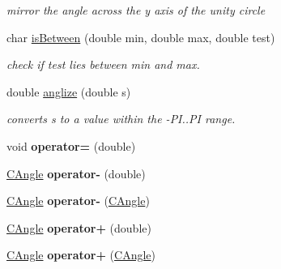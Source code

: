 \begin{DoxyCompactItemize}
\begin{DoxyCompactList}\small\item\em mirror the angle across the y axis of the unity circle \item\end{DoxyCompactList}\item 
char \hyperlink{class_c_angle_ab03cb0f761ee06e80835094b5817ba94}{isBetween} (double min, double max, double test)
\begin{DoxyCompactList}\small\item\em check if test lies between min and max. \item\end{DoxyCompactList}\item 
\hypertarget{class_c_angle_a72fd75c6aad269f339e0d7fc926e7569}{
double \hyperlink{class_c_angle_a72fd75c6aad269f339e0d7fc926e7569}{anglize} (double s)}
\label{class_c_angle_a72fd75c6aad269f339e0d7fc926e7569}

\begin{DoxyCompactList}\small\item\em converts s to a value within the -\/PI..PI range. \item\end{DoxyCompactList}\item 
\hypertarget{class_c_angle_a84945f984d1088fb0fa09b3c44b004ea}{
void {\bfseries operator=} (double)}
\label{class_c_angle_a84945f984d1088fb0fa09b3c44b004ea}

\item 
\hypertarget{class_c_angle_a9ccb59ecd849db986d78a44c69fa284a}{
\hyperlink{class_c_angle}{CAngle} {\bfseries operator-\/} (double)}
\label{class_c_angle_a9ccb59ecd849db986d78a44c69fa284a}

\item 
\hypertarget{class_c_angle_a6eb4a85cbb07d353873a34cfad48f337}{
\hyperlink{class_c_angle}{CAngle} {\bfseries operator-\/} (\hyperlink{class_c_angle}{CAngle})}
\label{class_c_angle_a6eb4a85cbb07d353873a34cfad48f337}

\item 
\hypertarget{class_c_angle_a0069cc4eb3577b04495b63bf1d1e2a15}{
\hyperlink{class_c_angle}{CAngle} {\bfseries operator+} (double)}
\label{class_c_angle_a0069cc4eb3577b04495b63bf1d1e2a15}

\item 
\hypertarget{class_c_angle_a3f041fc220a6d0299f4a9ee770c34af0}{
\hyperlink{class_c_angle}{CAngle} {\bfseries operator+} (\hyperlink{class_c_angle}{CAngle})}
\label{class_c_angle_a3f041fc220a6d0299f4a9ee770c34af0}

\end{DoxyCompactItemize}
